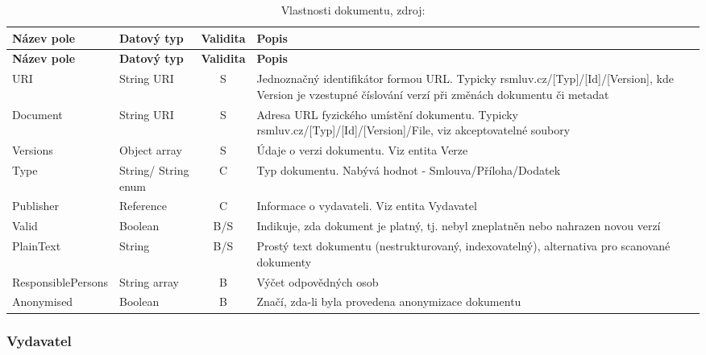 \begin{center}
\begin{longtable}{lp{20mm}cp{65mm}}
\label{grid_mlmmh} \\
\multicolumn{1}{l}{\textbf{Název pole}} & 
\multicolumn{1}{l}{\textbf{Datový typ}} & 
\multicolumn{1}{l}{\textbf{Validita}} & 
\multicolumn{1}{l}{\textbf{Popis}} \\ \hline 
\endfirsthead
\multicolumn{1}{l}{\textbf{Název pole}} & 
\multicolumn{1}{l}{\textbf{Datový typ}} & 
\multicolumn{1}{l}{\textbf{Validita}} & 
\multicolumn{1}{l}{\textbf{Popis}} \\ \hline 
\hline
\endhead
\endfoot
\caption[Vlastnosti dokumentu]{Vlastnosti dokumentu, zdroj:\cite{metodika, standard}}
\endlastfoot
\rowcolor{validateS}URI & String URI & S & Jednoznačný identifikátor formou URL. Typicky rsmluv.cz/[Typ]/[Id]/[Version], kde Version je vzestupné číslování verzí při změnách dokumentu či metadat \\
\rowcolor{validateS}Document & String URI & S & Adresa URL fyzického umístění dokumentu. Typicky rsmluv.cz/[Typ]/[Id]/[Version]/File, viz akceptovatelné soubory \\
\rowcolor{validateS}Versions & Object array & S & Údaje o verzi dokumentu. Viz entita Verze \\
\rowcolor{validateC}Type & String/ String enum & C & Typ dokumentu. Nabývá hodnot - Smlouva/Příloha/Dodatek \\
\rowcolor{validateC}Publisher & Reference & C & Informace o vydavateli. Viz entita Vydavatel \\
\rowcolor{validateB}Valid & Boolean & B/S & Indikuje, zda dokument je platný, tj. nebyl zneplatněn nebo nahrazen novou verzí \\
\rowcolor{validateB}PlainText & String & B/S & Prostý text dokumentu (nestrukturovaný, indexovatelný), alternativa pro scanované dokumenty \\
\rowcolor{validateB}ResponsiblePersons & String array & B & Výčet odpovědných osob \\
\rowcolor{validateB}Anonymised & Boolean & B & Značí, zda-li byla provedena anonymizace dokumentu \\
\end{longtable}
\end{center}

\subsubsection*{Vydavatel}

